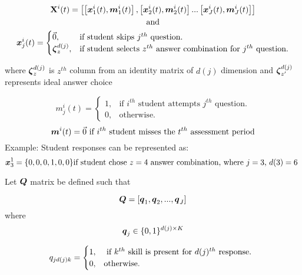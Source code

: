 \begin{definition}

\begin{multline}
    {\bf X}^{i}(t)  = \left[ 
\left[\boldsymbol{x}^{i}_{1}(t), \boldsymbol{m}^{i}_{1}(t) \right],
\left[\boldsymbol{x}^{i}_{2}(t), \boldsymbol{m}^{i}_{2}(t) \right]...
\left[\boldsymbol{x}^{i}_{J}(t), \boldsymbol{m}^{i}_{J}(t) \right]
\right]
\\ \text{and} \\
    \boldsymbol{x}^{i}_{j}(t) = \begin{cases}
    \vec{0}, & \text{if student skips $j^{th}$ question}.\\
    \boldsymbol{\zeta}^{d(j)}_{z}, & \text{if student selects $z^{th}$ answer combination for $j^{th}$ question}.
  \end{cases} 
\end{multline}

  where $\boldsymbol{\zeta}^{d(j)}_{z}$ is $z^{th}$ column from an identity matrix of $d(j)$ dimension and $\boldsymbol{\zeta}^{d(j)}_{z'}$ represents ideal answer choice

\begin{displaymath} 
  m^{i}_{j}(t)=\begin{cases}
    1, & \text{if $i^{th}$ student attempts $j^{th}$ question}.\\
    0, & \text{otherwise}.
  \end{cases}
\end{displaymath}
\begin{displaymath} 
  \boldsymbol{m}^{i}(t)= \vec{0} \text{ if $i^{th}$ student misses the $t^{th}$ assessment period}
\end{displaymath}
Example: Student responses can be represented as:
\[
\boldsymbol{x}^1_3 = \{0, 0, 0, 1, 0, 0\} \text{if student chose $z=4$ answer combination, where $j=3$, $d(3) = 6$ }\\
\]
\end{definition}

\begin{definition}
Let $\boldsymbol{Q}$ matrix be defined such that

\begin{equation*}
 \boldsymbol{Q} = [ {\boldsymbol{q}_1, \boldsymbol{q}_2, ..., \boldsymbol{q}_J}]
\end{equation*}
where 
\begin{equation*}
    \boldsymbol{q}_{j} \in \{ 0,1 \}^{d(j) \times K}
\end{equation*}

\begin{equation}
  q_{jd(j)k}=\begin{cases}
    1, & \text{ if $ k^{th} $ skill is present for $d(j)^{th}$ response. }\\
    0, & \text{otherwise.}
  \end{cases} 
\end{equation}


\end{definition}

